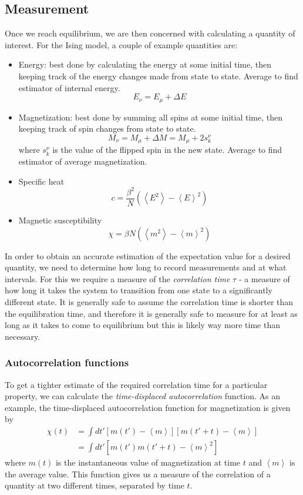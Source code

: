 \documentclass{article}
\begin{document}
\subsection{Measurement}
Once we reach equilibrium, we are then concerned with calculating a quantity of interest.
For the Ising model, a couple of example quantities are:
\begin{itemize}
\item Energy: best done by calculating the energy at some initial time, then keeping track of
the energy changes made from state to state. Average to find estimator of internal energy.
$$E_{\nu} = E_{\mu} + \Delta E$$
\item Magnetization: best done by summing all spins at some initial time, then keeping track
of spin changes from state to state.
$$M_{\nu} = M_{\mu} + \Delta M = M_{\mu} + 2s_{k}^{\nu}$$
where $s_{k}^{\nu}$ is the value of the flipped spin in the new state. Average to find
estimator of average magnetization.
\item Specific heat
$$c = \frac{\beta^{2}}{N}(\left \langle E^{2} \right \rangle - \left \langle E \right \rangle^{2})$$
\item Magnetic susceptibility
$$\chi = \beta N(\left \langle m^{2} \right \rangle - \left \langle m \right \rangle^{2})$$
\end{itemize}

In order to obtain an accurate estimation of the expectation value for a desired quantity,
we need to determine how long to record measurements and at what intervals. For this we require a measure of
the \emph{correlation time} $\tau$ - a measure of how long it takes the system to transition from
one state to a significantly different state. It is generally safe to assume the correlation time
is shorter than the equilibration time, and therefore it is generally safe to measure for at least
as long as it takes to come to equilibrium but this is likely way more time than necessary.

\subsubsection{Autocorrelation functions}
To get a tighter estimate of the required correlation time for a particular property,
we can calculate the \emph{time-displaced autocorrelation} function. As an example,
the time-displaced autocorrelation function for magnetization is given by
$$
\begin{aligned}
\chi(t) &= \int dt'[m(t') - \left \langle m \right \rangle][m(t' + t) - \left \langle m \right \rangle] \\
&= \int dt' [m(t')m(t' + t) - \left \langle m \right \rangle^{2}]
\end{aligned}
$$
where $m(t)$ is the instantaneous value of magnetization at time $t$ and $\left \langle m \right \rangle$ is the
average value. This function gives us a measure of the correlation of a quantity at two different times,
separated by time $t$.
\end{document}
